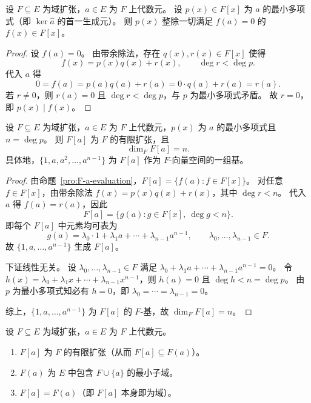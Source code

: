 \documentclass[lang=cn,a4paper,newtx]{elegantbook}
\begin{document}
\begin{proposition}
  设 $F\subseteq E$ 为域扩张，$a\in E$ 为 $F$ 上代数元。
  设 $p(x)\in F[x]$ 为 $a$ 的最小多项式（即 $\ker\hat a$ 的首一生成元）。
  则 $p(x)$ 整除一切满足 $f(a)=0$ 的 $f(x)\in F[x]$。
\end{proposition}
 
\begin{proof}
  设 $f(a)=0$。
  由带余除法，存在 $q(x),r(x)\in F[x]$ 使得
  \[
    f(x)=p(x)q(x)+r(x),\qquad \deg r<\deg p.
  \]
  代入 $a$ 得
  \[
    0=f(a)=p(a)q(a)+r(a)=0\cdot q(a)+r(a)=r(a).
  \]
  若 $r\ne 0$，则 $r(a)=0$ 且 $\deg r<\deg p$，与 $p$ 为最小多项式矛盾。
  故 $r=0$，即 $p(x)\mid f(x)$。
\end{proof}
 
\begin{proposition}
  设 $F\subseteq E$ 为域扩张，$a\in E$ 为 $F$ 上代数元，$p(x)$ 为 $a$ 的最小多项式且 $n=\deg p$。
  则 $F[a]$ 为 $F$ 的有限扩张，且
  \[
    \dim_F F[a]=n.
  \]
  具体地，$\{1,a,a^2,\dots,a^{n-1}\}$ 为 $F[a]$ 作为 $F$-向量空间的一组基。
\end{proposition}
 
\begin{proof}
  由命题~\ref{pro:F-a-evaluation}，$F[a]=\{f(a):f\in F[x]\}$。
  对任意 $f\in F[x]$，由带余除法 $f(x)=p(x)q(x)+r(x)$，其中 $\deg r<n$。
  代入 $a$ 得 $f(a)=r(a)$，因此
  \[
    F[a]=\{g(a):g\in F[x],\ \deg g<n\}.
  \]
  即每个 $F[a]$ 中元素均可表为
  \[
    g(a)=\lambda_0\cdot 1+\lambda_1 a+\cdots+\lambda_{n-1}a^{n-1},\qquad \lambda_0,\dots,\lambda_{n-1}\in F.
  \]
  故 $\{1,a,\dots,a^{n-1}\}$ 生成 $F[a]$。
 
  下证线性无关。
  设 $\lambda_0,\dots,\lambda_{n-1}\in F$ 满足 $\lambda_0+\lambda_1 a+\cdots+\lambda_{n-1}a^{n-1}=0$。
  令 $h(x)=\lambda_0+\lambda_1 x+\cdots+\lambda_{n-1}x^{n-1}$，则 $h(a)=0$ 且 $\deg h<n=\deg p$。
  由 $p$ 为最小多项式知必有 $h=0$，即 $\lambda_0=\cdots=\lambda_{n-1}=0$。
 
  综上，$\{1,a,\dots,a^{n-1}\}$ 为 $F[a]$ 的 $F$-基，故 $\dim_F F[a]=n$。
\end{proof}
 
\begin{proposition}
  设 $F\subseteq E$ 为域扩张，$a\in E$ 为 $F$ 上代数元。
  \begin{enumerate}
    \item $F[a]$ 为 $F$ 的有限扩张（从而 $F[a]\subseteq F(a)$）。
    \item $F(a)$ 为 $E$ 中包含 $F\cup\{a\}$ 的最小子域。
    \item $F[a]=F(a)$（即 $F[a]$ 本身即为域）。
  \end{enumerate}
\end{proposition}
\end{document}
